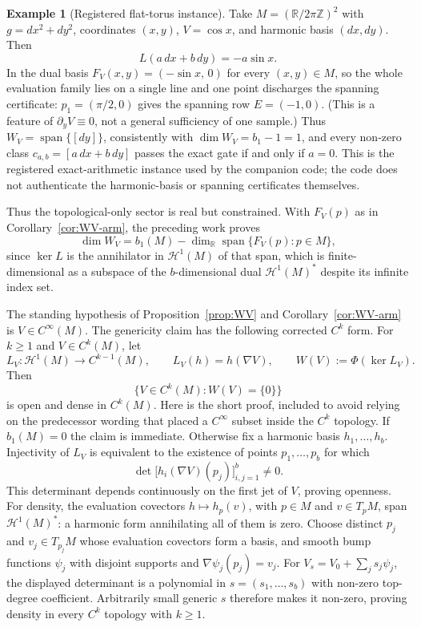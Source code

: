 \documentclass[11pt]{article}
\theoremstyle{definition}
\newtheorem{example}[theorem]{Example}
\begin{document}
\begin{example}[Registered flat-torus instance]\label{ex:WV-torus}
Take
\(M=(\mathbb R/2\pi\mathbb Z)^2\) with
\(g=dx^2+dy^2\), coordinates \((x,y)\), \(V=\cos x\), and harmonic
basis \((dx,dy)\).  Then
\[
L(a\,dx+b\,dy)=-a\sin x.
\]
In the dual basis \(F_V(x,y)=(-\sin x,\,0)\) for every \((x,y)\in M\), so
the whole evaluation family lies on a single line and one point discharges
the spanning certificate: \(p_1=(\pi/2,0)\) gives the spanning row
\(E=(-1,0)\).  (This is a feature of \(\partial_yV\equiv0\), not a general
sufficiency of one sample.)  Thus \(W_V=\operatorname{span}\{[dy]\}\),
consistently with \(\dim W_V=b_1-1=1\), and every
non-zero class \(c_{a,b}=[a\,dx+b\,dy]\) passes the exact gate if and
only if \(a=0\).  This is the registered exact-arithmetic instance used
by the companion code; the code does not authenticate the harmonic-basis
or spanning certificates themselves.
\end{example}

Thus the topological-only sector is real but constrained.  With
\(F_V(p)\) as in Corollary~\ref{cor:WV-arm}, the preceding work proves
\[
\dim W_V
=b_1(M)-\dim_{\mathbb R}
  \operatorname{span}\{F_V(p):p\in M\},
\]
since \(\ker L\) is the annihilator in \(\mathcal H^1(M)\) of that span,
which is finite-dimensional as a subspace of the \(b\)-dimensional dual
\(\mathcal H^1(M)^*\) despite its infinite index set.

The standing hypothesis of Proposition~\ref{prop:WV} and
Corollary~\ref{cor:WV-arm} is \(V\in C^\infty(M)\).  The genericity claim
has the following corrected \(C^k\) form.  For \(k\ge1\) and \(V\in C^k(M)\),
let
\[
L_V:\mathcal H^1(M)\longrightarrow C^{k-1}(M),
\qquad L_V(h)=h(\nabla V),
\qquad W(V):=\Phi(\ker L_V).
\]
Then
\[
\{V\in C^k(M):W(V)=\{0\}\}
\]
is open and dense in \(C^k(M)\).  Here is the short proof, included to
avoid relying on the predecessor wording that placed a \(C^\infty\)
subset inside the \(C^k\) topology.  If \(b_1(M)=0\) the claim is immediate.
Otherwise fix a harmonic basis \(h_1,\ldots,h_b\).  Injectivity of \(L_V\)
is equivalent to the existence of points \(p_1,\ldots,p_b\) for which
\[
\det\!\bigl[h_i(\nabla V)(p_j)\bigr]_{i,j=1}^b\neq0.
\]
This determinant depends continuously on the first jet of \(V\), proving
openness.  For density, the evaluation covectors
\(h\mapsto h_p(v)\), with \(p\in M\) and \(v\in T_pM\), span
\(\mathcal H^1(M)^*\): a harmonic form annihilating all of them is zero.
Choose distinct \(p_j\) and \(v_j\in T_{p_j}M\) whose evaluation covectors
form a basis, and smooth bump functions \(\psi_j\) with disjoint supports
and \(\nabla\psi_j(p_j)=v_j\).  For
\(V_s=V_0+\sum_js_j\psi_j\), the displayed determinant is a polynomial in
\(s=(s_1,\ldots,s_b)\) with non-zero top-degree coefficient.  Arbitrarily
small generic \(s\) therefore makes it non-zero, proving density in every
\(C^k\) topology with \(k\ge1\).
\end{document}
